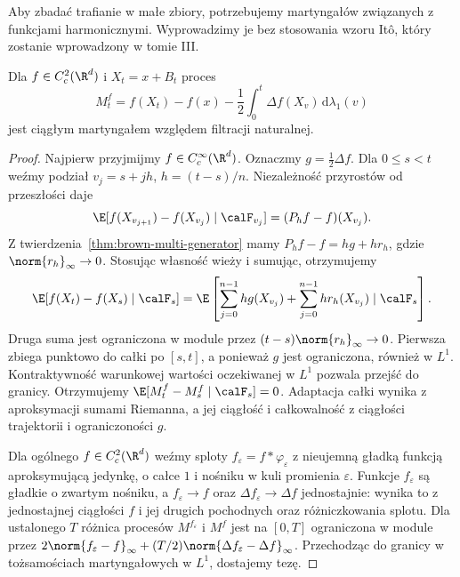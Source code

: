 Aby zbadać trafianie w małe zbiory, potrzebujemy
martyngałów związanych z funkcjami harmonicznymi.
Wyprowadzimy je bez stosowania wzoru Itô, który
zostanie wprowadzony w tomie III.

\begin{lemat}
\label{lem:brown-generator-martingale}
Dla $f\in C_c^2(\R^d)$ i $X_t=x+B_t$ proces
\[
M_t^f=f(X_t)-f(x)-\frac12\int_0^t
\Delta f(X_v)\,\mathrm d\lambda_1(v)
\]
jest ciągłym martyngałem względem filtracji naturalnej.
\end{lemat}
\begin{proof}
Najpierw przyjmijmy $f\in C_c^\infty(\R^d)$.
Oznaczmy $g=\frac12\Delta f$. Dla $0\le s<t$
weźmy podział $v_j=s+jh$, $h=(t-s)/n$.
Niezależność przyrostów od przeszłości daje
\[
\E[f(X_{v_{j+1}})-f(X_{v_j})\mid\calF_{v_j}]
=(P_h f-f)(X_{v_j}).
\]
Z twierdzenia~\ref{thm:brown-multi-generator}
mamy $P_h f-f=hg+h r_h$, gdzie
$\norm{r_h}_\infty\to0$. Stosując własność wieży
i sumując, otrzymujemy
\[
\E[f(X_t)-f(X_s)\mid\calF_s]
=\E\left[\sum_{j=0}^{n-1}h g(X_{v_j})
+\sum_{j=0}^{n-1}h r_h(X_{v_j})\mid\calF_s\right].
\]
Druga suma jest ograniczona w module przez
$(t-s)\norm{r_h}_\infty\to0$. Pierwsza zbiega
punktowo do całki po $[s,t]$, a ponieważ $g$
jest ograniczona, również w $L^1$.
Kontraktywność warunkowej wartości oczekiwanej
w $L^1$ pozwala przejść do granicy. Otrzymujemy
$\E[M_t^f-M_s^f\mid\calF_s]=0$.
Adaptacja całki wynika z aproksymacji sumami
Riemanna, a jej ciągłość i całkowalność
z ciągłości trajektorii i ograniczoności $g$.

Dla ogólnego $f\in C_c^2(\R^d)$ weźmy sploty
$f_\varepsilon=f*\varphi_\varepsilon$ z nieujemną
gładką funkcją aproksymującą jedynkę, o całce $1$
i nośniku w kuli promienia $\varepsilon$.
Funkcje $f_\varepsilon$ są gładkie o zwartym nośniku,
a $f_\varepsilon\to f$ oraz
$\Delta f_\varepsilon\to\Delta f$ jednostajnie:
wynika to z jednostajnej ciągłości $f$ i jej drugich
pochodnych oraz różniczkowania splotu.
Dla ustalonego $T$ różnica procesów $M^{f_\varepsilon}$
i $M^f$ jest na $[0,T]$ ograniczona w module przez
$2\norm{f_\varepsilon-f}_\infty+
(T/2)\norm{\Delta f_\varepsilon-\Delta f}_\infty$.
Przechodząc do granicy w tożsamościach
martyngałowych w $L^1$, dostajemy tezę.
\end{proof}

